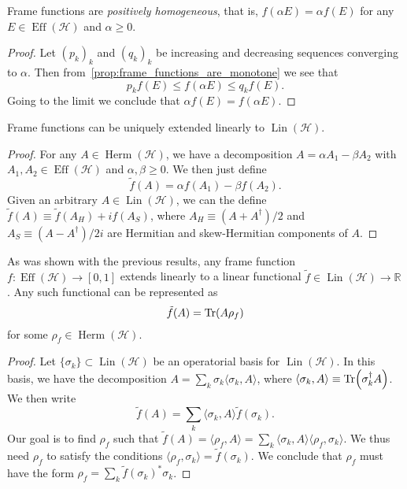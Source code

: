 \documentclass[a4paper]{report}
\newcommand{\RR}{\mathbb{R}}
\newcommand{\on}[1]{\operatorname{#1}}
\newcommand{\calH}{{\mathcal{H}}}
\DeclareMathOperator{\Herm}{Herm}
\DeclareMathOperator{\Lin}{Lin}
\begin{document}
\begin{prop}
	Frame functions are \emph{positively homogeneous}, that is, $f(\alpha E)=\alpha f(E)$ for any $E\in\on{Eff}(\calH)$ and $\alpha\ge0$.
\end{prop}
\begin{proof}
	Let $(p_k)_k$ and $(q_k)_k$ be increasing and decreasing sequences converging to $\alpha$. Then from~\cref{prop:frame_functions_are_monotone} we see that
	\begin{equation}
		p_k f(E) \le f(\alpha E) \le q_k f(E).
	\end{equation}
	Going to the limit we conclude that $\alpha f(E)=f(\alpha E)$.
\end{proof}

\begin{prop}
	Frame functions can be uniquely extended linearly to $\Lin(\calH)$.
\end{prop}
\begin{proof}
	For any $A\in\Herm(\calH)$, we have a decomposition $A=\alpha A_1 - \beta A_2$ with $A_1,A_2\in\on{Eff}(\calH)$ and $\alpha,\beta\ge0$.
	We then just define
	\begin{equation}
		\tilde f(A) = \alpha f(A_1) - \beta f(A_2).
	\end{equation}
	Given an arbitrary $A\in\Lin(\calH)$, we can the define $\tilde f(A)\equiv \tilde f(A_H) + i f(A_S)$, where $A_H\equiv (A+A^\dagger)/2$ and $A_S\equiv (A-A^\dagger)/2i$ are Hermitian and skew-Hermitian components of $A$.
\end{proof}

\begin{prop}
	As was shown with the previous results, any frame function $f:\on{Eff}(\calH)\to[0,1]$ extends linearly to a linear functional $\tilde f\in\Lin(\calH)\to\RR$. Any such functional can be represented as
	\begin{equation}
		\tilde f(A) = \Tr(A \rho_f)
	\end{equation}
	for some $\rho_f\in\Herm(\calH)$.
\end{prop}
\begin{proof}
	Let $\{\sigma_k\}\subset\Lin(\calH)$ be an operatorial basis for $\Lin(\calH)$.
	In this basis, we have the decomposition $A=\sum_k \sigma_k \langle \sigma_k, A\rangle$, where $\langle \sigma_k,A\rangle\equiv\Tr(\sigma_k^\dagger A)$.
	We then write
	\begin{equation}
		\tilde f(A) = \sum_k \langle \sigma_k,A\rangle \tilde f(\sigma_k).
	\end{equation}
	Our goal is to find $\rho_f$ such that $\tilde f(A)=\langle \rho_f,A\rangle = \sum_k \langle\sigma_k,A\rangle \langle\rho_f,\sigma_k\rangle$.
	We thus need $\rho_f$ to satisfy the conditions
	$\langle\rho_f,\sigma_k\rangle = \tilde f(\sigma_k)$.
	We conclude that $\rho_f$ must have the form $\rho_f=\sum_k \tilde f(\sigma_k)^* \sigma_k$.
\end{proof}
\end{document}
